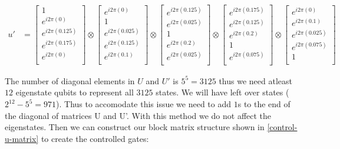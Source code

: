 \documentclass[msc,oneside]{ubcthesis}
\begin{document}
	\begin{align*}	
	u' & = \begin{bmatrix}
		1 \\
		e^{i2\pi(0)} \\
		e^{i2\pi(0.125)} \\
		e^{i2\pi(0.175)} \\
		e^{i2\pi(0)} \\
	\end{bmatrix} 
	\otimes \begin{bmatrix}
		e^{i2\pi(0)} \\
		1 \\
		e^{i2\pi(0.025)} \\
		e^{i2\pi(0.125)} \\
		e^{i2\pi(0.1)} \\
	\end{bmatrix}
	\otimes \begin{bmatrix}
		e^{i2\pi(0.125)} \\
		e^{i2\pi(0.025)} \\
		1\\
		e^{i2\pi(0.2)} \\
		e^{i2\pi(0.025)} \\
	\end{bmatrix} 
	\otimes \begin{bmatrix}
		e^{i2\pi(0.175)} \\
		e^{i2\pi(0.125)} \\
		e^{i2\pi(0.2)} \\
		1 \\
		e^{i2\pi(0.075)} \\
	\end{bmatrix} 
	\otimes \begin{bmatrix}
		e^{i2\pi(0)} \\
		e^{i2\pi(0.1)} \\
		e^{i2\pi(0.025)} \\
		e^{i2\pi(0.075)} \\
		1 \\
	\end{bmatrix} 							 			
\end{align*}
	
	The number of diagonal elements in $U$ and $U'$ is $5^5 = 3125$ thus we need atleast $12$ eigenstate qubits to represent all $3125$ states. We will have left over states ($2^{12} - 5^5 = 971$). Thus to accomodate this issue we need to add $1$s to the end of the diagonal of matrices U and U'. With this method we do not affect the eigenstates. Then we can construct our block matrix structure shown in \ref{control-u-matrix} to create the controlled gates:
	
\end{document}
